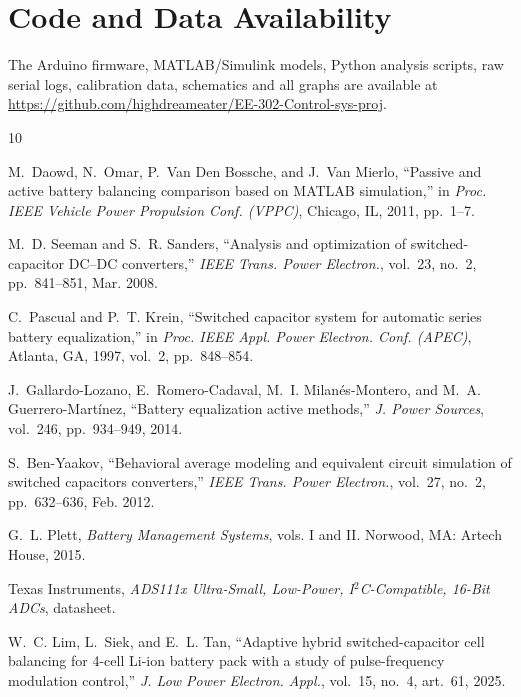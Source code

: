 \documentclass[conference]{IEEEtran}
\begin{document}
\section*{Code and Data Availability}
The Arduino firmware, MATLAB/Simulink models, Python analysis scripts, raw serial logs, calibration data,
schematics and all graphs are available at \url{https://github.com/highdreameater/EE-302-Control-sys-proj}.

\begin{thebibliography}{10}

M.~Daowd, N.~Omar, P.~Van Den Bossche, and J.~Van Mierlo, ``Passive and active battery balancing comparison based
on MATLAB simulation,'' in \emph{Proc. IEEE Vehicle Power Propulsion Conf. (VPPC)}, Chicago, IL, 2011, pp.~1--7.

M.~D. Seeman and S.~R. Sanders, ``Analysis and optimization of switched-capacitor DC--DC converters,''
\emph{IEEE Trans. Power Electron.}, vol.~23, no.~2, pp.~841--851, Mar. 2008.

C.~Pascual and P.~T. Krein, ``Switched capacitor system for automatic series battery equalization,'' in
\emph{Proc. IEEE Appl. Power Electron. Conf. (APEC)}, Atlanta, GA, 1997, vol.~2, pp.~848--854.

J.~Gallardo-Lozano, E.~Romero-Cadaval, M.~I. Milan\'es-Montero, and M.~A. Guerrero-Mart\'inez, ``Battery
equalization active methods,'' \emph{J. Power Sources}, vol.~246, pp.~934--949, 2014.

S.~Ben-Yaakov, ``Behavioral average modeling and equivalent circuit simulation of switched capacitors
converters,'' \emph{IEEE Trans. Power Electron.}, vol.~27, no.~2, pp.~632--636, Feb. 2012.

G.~L. Plett, \emph{Battery Management Systems}, vols. I and II. Norwood, MA: Artech House, 2015.

Texas Instruments, \emph{ADS111x Ultra-Small, Low-Power, I$^2$C-Compatible, 16-Bit ADCs}, datasheet.

W.~C. Lim, L.~Siek, and E.~L. Tan, ``Adaptive hybrid switched-capacitor cell balancing for 4-cell Li-ion battery
pack with a study of pulse-frequency modulation control,'' \emph{J. Low Power Electron. Appl.}, vol.~15, no.~4,
art.~61, 2025.

\end{thebibliography}
\end{document}
